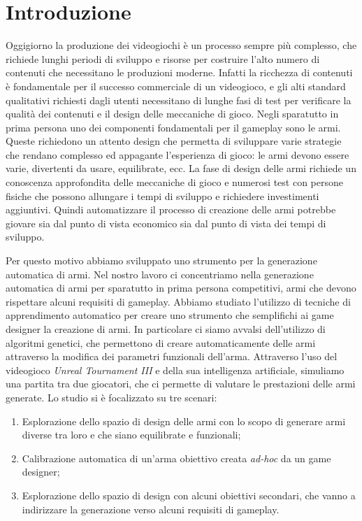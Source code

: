 \documentclass[12pt, italian]{toptesi}
\begin{document}
\mainmatter

\chapter{Introduzione}

Oggigiorno la produzione dei videogiochi è un processo sempre più complesso, che richiede lunghi periodi di sviluppo e risorse per costruire l'alto numero di contenuti che necessitano le produzioni moderne.
Infatti la ricchezza di contenuti è fondamentale per il successo commerciale di un videogioco, e gli alti standard qualitativi richiesti dagli utenti necessitano di lunghe fasi di test per verificare la qualità dei contenuti e il design delle meccaniche di gioco.
Negli sparatutto in prima persona uno dei componenti fondamentali per il gameplay sono le armi. Queste richiedono un attento design che permetta di sviluppare varie strategie che rendano complesso ed appagante l'esperienza di gioco: le armi devono essere varie, divertenti da usare, equilibrate, ecc.
La fase di design delle armi richiede un conoscenza approfondita delle meccaniche di gioco e numerosi test con persone fisiche che possono allungare i tempi di sviluppo e richiedere investimenti aggiuntivi.
Quindi automatizzare il processo di creazione delle armi potrebbe giovare sia dal punto di vista economico sia dal punto di vista dei tempi di sviluppo.

Per questo motivo abbiamo sviluppato uno strumento per la generazione automatica di armi.
Nel nostro lavoro ci concentriamo nella generazione automatica di armi per sparatutto in prima persona competitivi, armi che devono rispettare alcuni requisiti di gameplay.
Abbiamo studiato l'utilizzo di tecniche di apprendimento automatico per creare uno strumento che semplifichi ai game designer la creazione di armi.
In particolare ci siamo avvalsi dell'utilizzo di algoritmi genetici, che permettono di creare automaticamente delle armi attraverso la modifica dei parametri funzionali dell'arma.
Attraverso l'uso del videogioco \emph{Unreal Tournament III} e della sua intelligenza artificiale, simuliamo una partita tra due giocatori, che ci permette di valutare le prestazioni delle armi generate.
Lo studio si è focalizzato su tre scenari: 
\begin{enumerate}
\item Esplorazione dello spazio di design delle armi con lo scopo di generare armi diverse tra loro e che siano equilibrate e funzionali;
\item Calibrazione automatica di un'arma obiettivo creata \emph{ad-hoc} da un game designer;
\item Esplorazione dello spazio di design con alcuni obiettivi secondari, che vanno a indirizzare la generazione verso alcuni requisiti di gameplay.
\end{enumerate}
\end{document}
